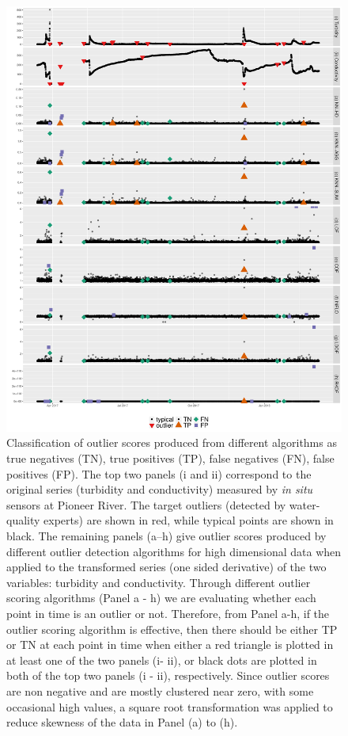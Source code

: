 \documentclass[draft]{agujournal2018} %
\begin{document}
\begin{figure}[H]

{\centering \includegraphics[width=1\linewidth,height=0.8\textheight]{./fig/onesidedderivativeTCpioneer-1.pdf}

}

\caption{Classification of outlier scores produced from different algorithms as true negatives (TN), true positives (TP), false negatives (FN), false positives (FP). The top two panels (i and ii) correspond to the original series (turbidity and conductivity) measured by \textit{in situ} sensors at Pioneer River. The target outliers (detected by water-quality experts) are shown in red, while typical points are shown in black. The remaining panels (a--h) give outlier scores produced by different outlier detection algorithms for high dimensional data when applied to the transformed series (one sided derivative) of the two variables: turbidity and conductivity. \color{black} Through different outlier scoring algorithms (Panel a - h) we are evaluating whether each point in time is an outlier or not. Therefore, from Panel a-h, if the outlier scoring algorithm is effective, then there should be either TP or TN  at each point in time when either a red triangle is plotted in at least one of the two panels (i- ii), or  black dots are plotted  in both of the top two panels (i - ii), respectively. Since outlier scores are non negative and are mostly clustered near zero, with some occasional high values, a square root transformation was applied to reduce skewness of the data in Panel (a) to (h). \color{black}}\label{fig:oneSidedDerivativeTCPioneerPng}
\end{figure}
\end{document}
